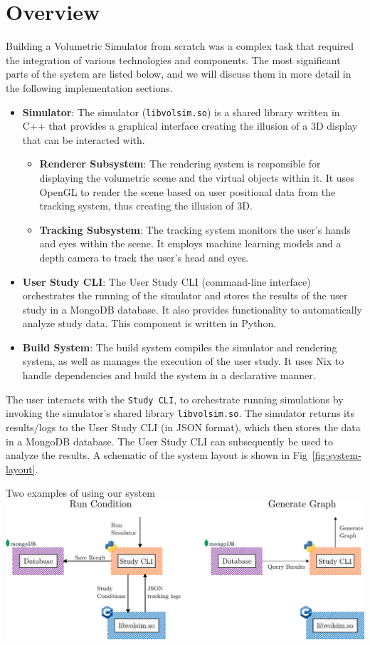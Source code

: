 \section{Overview}

Building a Volumetric Simulator from scratch was a complex task that required the integration of various technologies and components. The most significant parts of the system are listed below, and we will discuss them in more detail in the following implementation sections.

\begin{itemize}[itemsep=-0.15em, label={}]
	\item \textbf{Simulator}: The simulator (\texttt{libvolsim.so}) is a shared library written in C++ that provides a graphical interface creating the illusion of a 3D display that can be interacted with.
	      \begin{itemize}[itemsep=-0.15em]
		      \item \textbf{Renderer Subsystem}: The rendering system is responsible for displaying the volumetric scene and the virtual objects within it. It uses OpenGL to render the scene based on user positional data from the tracking system, thus creating the illusion of 3D.
		      \item \textbf{Tracking Subsystem}: The tracking system monitors the user's hands and eyes within the scene. It employs machine learning models and a depth camera to track the user's head and eyes.
	      \end{itemize}
	\item \textbf{User Study CLI}: The User Study CLI (command-line interface) orchestrates the running of the simulator and stores the results of the user study in a MongoDB database. It also provides functionality to automatically analyze study data. This component is written in Python.
	\item \textbf{Build System}: The build system compiles the simulator and rendering system, as well as manages the execution of the user study. It uses Nix to handle dependencies and build the system in a declarative manner.
\end{itemize}

The user interacts with the \texttt{Study CLI}, to orchestrate running simulations by invoking the simulator's shared library \texttt{libvolsim.so}. The simulator returns its results/logs to the User Study CLI (in JSON format), which then stores the data in a MongoDB database. The User Study CLI can subsequently be used to analyze the results. A schematic of the system layout is shown in Fig~\ref{fig:system-layout}.

\begin{figureBox}[label={fig:system-layout}, width=1.0\linewidth]{Two examples of using our system}
    \includegraphics[width = 0.9\linewidth]{./implementation/figures/overall-system.pdf}
\end{figureBox}